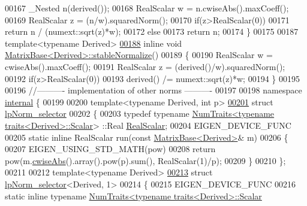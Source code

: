 \begin{DoxyCode}
00167   \_Nested n(derived());
00168   RealScalar w = n.cwiseAbs().maxCoeff();
00169   RealScalar z = (n/w).squaredNorm();
00170   \textcolor{keywordflow}{if}(z>RealScalar(0))
00171     \textcolor{keywordflow}{return} n / (numext::sqrt(z)*w);
00172   \textcolor{keywordflow}{else}
00173     \textcolor{keywordflow}{return} n;
00174 \}
00175 
00187 \textcolor{keyword}{template}<\textcolor{keyword}{typename} Derived>
\hyperlink{group___core___module_a0b1443fa322615379557ade3399a3c3c}{00188} \textcolor{keyword}{inline} \textcolor{keywordtype}{void} \hyperlink{group___core___module_a0b1443fa322615379557ade3399a3c3c}{MatrixBase<Derived>::stableNormalize}()
00189 \{
00190   RealScalar w = cwiseAbs().maxCoeff();
00191   RealScalar z = (derived()/w).squaredNorm();
00192   \textcolor{keywordflow}{if}(z>RealScalar(0))
00193     derived() /= numext::sqrt(z)*w;
00194 \}
00195 
00196 \textcolor{comment}{//---------- implementation of other norms ----------}
00197 
00198 \textcolor{keyword}{namespace }\hyperlink{namespaceinternal}{internal} \{
00199 
00200 \textcolor{keyword}{template}<\textcolor{keyword}{typename} Derived, \textcolor{keywordtype}{int} p>
\hyperlink{struct_eigen_1_1internal_1_1lp_norm__selector}{00201} \textcolor{keyword}{struct }\hyperlink{struct_eigen_1_1internal_1_1lp_norm__selector}{lpNorm\_selector}
00202 \{
00203   \textcolor{keyword}{typedef} \textcolor{keyword}{typename} \hyperlink{group___core___module_struct_eigen_1_1_num_traits}{NumTraits<typename traits<Derived>::Scalar}>
      ::Real \hyperlink{group___sparse_core___module}{RealScalar};
00204   EIGEN\_DEVICE\_FUNC
00205   \textcolor{keyword}{static} \textcolor{keyword}{inline} RealScalar run(\textcolor{keyword}{const} \hyperlink{group___core___module_class_eigen_1_1_matrix_base}{MatrixBase<Derived>}& m)
00206   \{
00207     EIGEN\_USING\_STD\_MATH(pow)
00208     \textcolor{keywordflow}{return} pow(m.\hyperlink{group___core___module_a8f2dbd5d9573c79c5dd356ddb29a0ee9}{cwiseAbs}().array().pow(p).sum(), RealScalar(1)/p);
00209   \}
00210 \};
00211 
00212 \textcolor{keyword}{template}<\textcolor{keyword}{typename} Derived>
\hyperlink{struct_eigen_1_1internal_1_1lp_norm__selector_3_01_derived_00_011_01_4}{00213} \textcolor{keyword}{struct }\hyperlink{struct_eigen_1_1internal_1_1lp_norm__selector}{lpNorm\_selector}<Derived, 1>
00214 \{
00215   EIGEN\_DEVICE\_FUNC
00216   \textcolor{keyword}{static} \textcolor{keyword}{inline} \textcolor{keyword}{typename} \hyperlink{group___core___module_struct_eigen_1_1_num_traits}{NumTraits<typename traits<Derived>::Scalar}

\end{DoxyCode}
